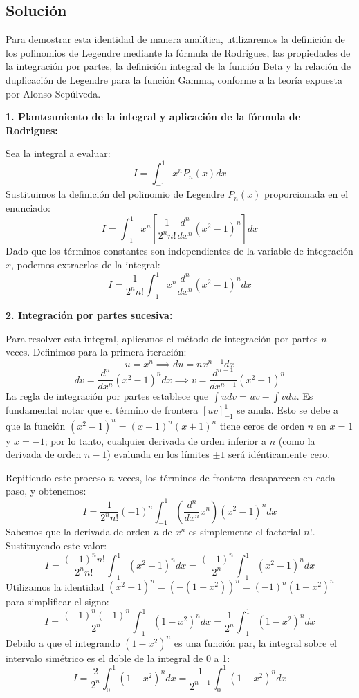 \documentclass[a4paper]{article}
\begin{document}
\subsection{Solución}

Para demostrar esta identidad de manera analítica, utilizaremos la definición de los polinomios de Legendre mediante la fórmula de Rodrigues, las propiedades de la integración por partes, la definición integral de la función Beta y la relación de duplicación de Legendre para la función Gamma, conforme a la teoría expuesta por Alonso Sepúlveda.

\textbf{1. Planteamiento de la integral y aplicación de la fórmula de Rodrigues:}

Sea la integral a evaluar:
$$ I = \int_{-1}^1 x^n P_n(x) dx $$
Sustituimos la definición del polinomio de Legendre $P_n(x)$ proporcionada en el enunciado:
$$ I = \int_{-1}^1 x^n \left[ \frac{1}{2^n n!} \frac{d^n}{dx^n} (x^2 - 1)^n \right] dx $$
Dado que los términos constantes son independientes de la variable de integración $x$, podemos extraerlos de la integral:
$$ I = \frac{1}{2^n n!} \int_{-1}^1 x^n \frac{d^n}{dx^n} (x^2 - 1)^n dx $$

\textbf{2. Integración por partes sucesiva:}

Para resolver esta integral, aplicamos el método de integración por partes $n$ veces. Definimos para la primera iteración:
$$ u = x^n \implies du = n x^{n-1} dx $$
$$ dv = \frac{d^n}{dx^n} (x^2 - 1)^n dx \implies v = \frac{d^{n-1}}{dx^{n-1}} (x^2 - 1)^n $$
La regla de integración por partes establece que $\int u dv = uv - \int v du$. Es fundamental notar que el término de frontera $[uv]_{-1}^1$ se anula. Esto se debe a que la función $(x^2 - 1)^n = (x-1)^n(x+1)^n$ tiene ceros de orden $n$ en $x=1$ y $x=-1$; por lo tanto, cualquier derivada de orden inferior a $n$ (como la derivada de orden $n-1$) evaluada en los límites $\pm 1$ será idénticamente cero.

Repitiendo este proceso $n$ veces, los términos de frontera desaparecen en cada paso, y obtenemos:
$$ I = \frac{1}{2^n n!} (-1)^n \int_{-1}^1 \left( \frac{d^n}{dx^n} x^n \right) (x^2 - 1)^n dx $$
Sabemos que la derivada de orden $n$ de $x^n$ es simplemente el factorial $n!$. Sustituyendo este valor:
$$ I = \frac{(-1)^n n!}{2^n n!} \int_{-1}^1 (x^2 - 1)^n dx = \frac{(-1)^n}{2^n} \int_{-1}^1 (x^2 - 1)^n dx $$
Utilizamos la identidad $(x^2 - 1)^n = (-(1 - x^2))^n = (-1)^n (1 - x^2)^n$ para simplificar el signo:
$$ I = \frac{(-1)^n (-1)^n}{2^n} \int_{-1}^1 (1 - x^2)^n dx = \frac{1}{2^n} \int_{-1}^1 (1 - x^2)^n dx $$
Debido a que el integrando $(1 - x^2)^n$ es una función par, la integral sobre el intervalo simétrico es el doble de la integral de 0 a 1:
$$ I = \frac{2}{2^n} \int_{0}^1 (1 - x^2)^n dx = \frac{1}{2^{n-1}} \int_{0}^1 (1 - x^2)^n dx $$
\end{document}

